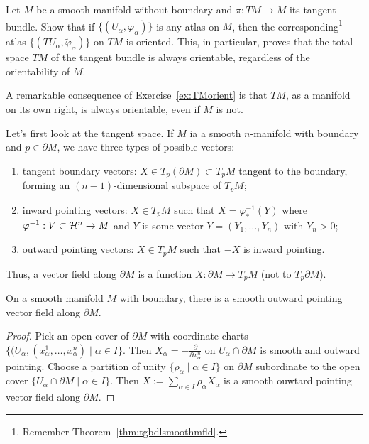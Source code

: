\begin{exercise}\label{ex:TMorient}
  Let $M$ be a smooth manifold without boundary and $\pi: TM \to M$ its tangent bundle.
  Show that if $\{(U_\alpha,\varphi_\alpha)\}$ is any atlas on $M$, then the corresponding\footnote{Remember Theorem~\ref{thm:tgbdlsmoothmfld}.} atlas $\{(TU_\alpha, \widetilde\varphi_\alpha)\}$ on $TM$ is oriented.
  This, in particular, proves that the total space $TM$ of the tangent bundle is always orientable, regardless of the orientability of $M$.
\end{exercise}

A remarkable consequence of Exercise~\ref{ex:TMorient} is that $TM$, as a manifold on its own right, is always orientable, even if $M$ is not. 


Let's first look at the tangent space. 
If $M$ ia a smooth $n$-manifold with boundary and $p\in \partial M$, we have three types of possible vectors:
\begin{enumerate}
  \item tangent boundary vectors: $X\in T_p(\partial M)\subset T_p M$ tangent to the boundary, forming an $(n-1)$-dimensional subspace of $T_p M$;
  \item inward pointing vectors: $X\in T_pM$ such that $X = \varphi^{-1}_*(Y)$ where $\varphi^{-1}: V\subset \mathcal{H}^n \to M$ and $Y$ is some vector $Y = (Y_1, \ldots, Y_n)$ with $Y_n > 0$;
  \item outward pointing vectors: $X\in T_pM$ such that $-X$ is inward pointing.
\end{enumerate}
Thus, a vector field along $\partial M$ is a function $X:\partial M\to T_pM$ (not to $T_p\partial M$).

\begin{proposition}
  On a smooth manifold $M$ with boundary, there is a smooth outward pointing vector field along $\partial M$.  
\end{proposition}
\begin{proof}
  Pick an open cover of $\partial M$ with coordinate charts $\{(U_\alpha, (x^1_\alpha,\ldots,x^n_\alpha) \mid \alpha\in I\}$.
  Then $X_\alpha = -\frac{\partial}{\partial x^n_\alpha}$ on $U_\alpha\cap \partial M$ is smooth and outward pointing.
  Choose a partition of unity $\{\rho_\alpha \mid \alpha\in I\}$ on $\partial M$ subordinate to the open cover $\{U_\alpha\cap \partial M \mid \alpha\in I\}$.
  Then $X:= \sum_{\alpha\in I}\rho_\alpha X_\alpha$ is a smooth ouwtard pointing vector field along $\partial M$.
\end{proof}

